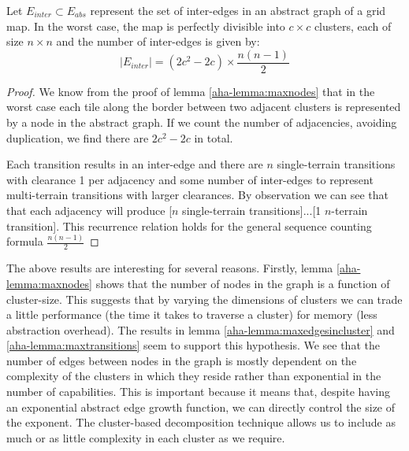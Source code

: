 \begin{lemma}
\label{aha-lemma:maxtransitions}
Let $E_{inter} \subset E_{abs}$ represent the set of inter-edges in an abstract graph of a grid map. In the worst case, the map is perfectly divisible into $c \times c$ clusters, each of size $n \times n$ and the number of inter-edges is given by:
$$|E_{inter}| = (2c^2 - 2c)\times \frac{n(n-1)}{2}$$
\end{lemma}

\begin{proof}
We know from the proof of lemma \ref{aha-lemma:maxnodes} that in the worst case each tile along the border between two adjacent clusters is represented by a node in the abstract graph. 
If we count the number of adjacencies, avoiding duplication, we find there are $2c^2 - 2c$ in total.
\par \indent
Each transition results in an inter-edge and there are $n$ single-terrain transitions with clearance 1 per adjacency and some number of inter-edges to represent multi-terrain transitions with larger clearances. 
By observation we can see that that each adjacency will produce [$n$ single-terrain transitions]...[1 $n$-terrain transition]. 
This recurrence relation holds for the general sequence counting formula $\frac{n(n-1)}{2}$
\end{proof}

The above results are interesting for several reasons. 
Firstly, lemma \ref{aha-lemma:maxnodes} shows that the number of nodes in the graph is a function of cluster-size. This suggests that by varying the dimensions of clusters we can trade a little performance (the time it takes to traverse a cluster) for memory (less abstraction overhead).
The results in lemma \ref{aha-lemma:maxedgesincluster} and \ref{aha-lemma:maxtransitions} seem to support this hypothesis. 
We see that the number of edges between nodes in the graph is mostly dependent on the complexity of the clusters in which they reside rather than exponential in the number of capabilities. 
This is important because it means that, despite having an exponential abstract edge growth function, we can directly control the size of the exponent.
The cluster-based decomposition technique allows us to include as much or as little complexity in each cluster as we require.
